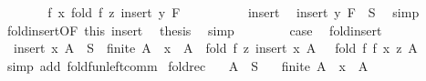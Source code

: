 \begin{isabellebody}
\ \ \isamarkupfalse%
\ \isamarkupfalse%
\ {\isachardoublequoteopen}{\isasymdots}\ {\isacharequal}{\kern0pt}\ f\ x\ {\isacharparenleft}{\kern0pt}fold\ f\ z\ {\isacharparenleft}{\kern0pt}insert\ y\ F{\isacharparenright}{\kern0pt}{\isacharparenright}{\kern0pt}{\isachardoublequoteclose}\isanewline
\ \ \isamarkupfalse%
\ {\isacharminus}{\kern0pt}\isanewline
\ \ \ \ \isamarkupfalse%
\ insert\ \isamarkupfalse%
\ {\isachardoublequoteopen}insert\ y\ F\ {\isasymsubseteq}\ S{\isachardoublequoteclose}\ \isamarkupfalse%
\ simp\isanewline
\ \ \ \ \isamarkupfalse%
\ fold{\isacharunderscore}{\kern0pt}insert{\isacharbrackleft}{\kern0pt}OF\ this{\isacharbrackright}{\kern0pt}\ insert\ \isamarkupfalse%
\ {\isacharquery}{\kern0pt}thesis\ \isamarkupfalse%
\ simp\isanewline
\ \ \isamarkupfalse%
\isanewline
\ \ \isamarkupfalse%
\ \isamarkupfalse%
\ {\isacharquery}{\kern0pt}case\ \isacommand{{\isachardot}{\kern0pt}{\isachardot}{\kern0pt}}\isamarkupfalse%
\isanewline
{}\isamarkupfalse%
%
\endisatagproof
{\isafoldproof}%
%
\isadelimproof
\isanewline
%
\endisadelimproof
\isanewline
{}\isamarkupfalse%
\ fold{\isacharunderscore}{\kern0pt}insert{}{\isacharcolon}{\kern0pt}\isanewline
\ \ {\isachardoublequoteopen}insert\ x\ A\ {\isasymsubseteq}\ S\ {\isasymLongrightarrow}\ finite\ A\ {\isasymLongrightarrow}\ x\ {\isasymnotin}\ A\ {\isasymLongrightarrow}\ fold\ f\ z\ {\isacharparenleft}{\kern0pt}insert\ x\ A{\isacharparenright}{\kern0pt}\ \ {\isacharequal}{\kern0pt}\ fold\ f\ {\isacharparenleft}{\kern0pt}f\ x\ z{\isacharparenright}{\kern0pt}\ A{\isachardoublequoteclose}\isanewline
%
\isadelimproof
\ \ %
\endisadelimproof
%
\isatagproof
{}\isamarkupfalse%
\ {\isacharparenleft}{\kern0pt}simp\ add{\isacharcolon}{\kern0pt}\ fold{\isacharunderscore}{\kern0pt}fun{\isacharunderscore}{\kern0pt}left{\isacharunderscore}{\kern0pt}comm{\isacharparenright}{\kern0pt}%
\endisatagproof
{\isafoldproof}%
%
\isadelimproof
\isanewline
%
\endisadelimproof
\isanewline
{}\isamarkupfalse%
\ fold{\isacharunderscore}{\kern0pt}rec{\isacharcolon}{\kern0pt}\isanewline
\ \ \ {\isachardoublequoteopen}A\ {\isasymsubseteq}\ S{\isachardoublequoteclose}\isanewline
\ \ \ {\isachardoublequoteopen}finite\ A{\isachardoublequoteclose}\ \ {\isachardoublequoteopen}x\ {\isasymin}\ A{\isachardoublequoteclose}\isanewline

\end{isabellebody}

